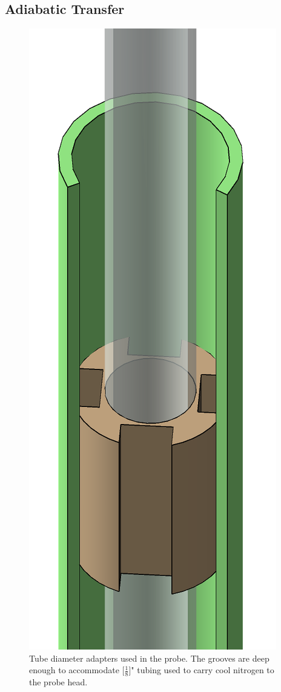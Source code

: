 \documentclass[PaulGanssle-Thesis.tex]{subfiles}
\begin{document}
\subsection{Adiabatic Transfer}
\label{nmr.pneumatic.adiabatic.transfer}
\begin{figure}
\includegraphics[width=0.3\tw]{figures/magnetometer/TubeSpacerInTube.png}
\caption{Tube diameter adapters used in the probe. The grooves are deep enough to accommodate \unit[$\frac{1}{8}$]{"} tubing used to carry cool nitrogen to the probe head.}
\label{fig:nmr.probe.outeradapters}
\vspace*{-0.5\lineheight}
\end{figure}
\end{document}
